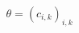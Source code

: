 \documentclass[preview]{standalone}
\begin{document}
\begin{align*}
\theta  = (c_{i,k})_{i,k}
\end{align*}
\end{document}
